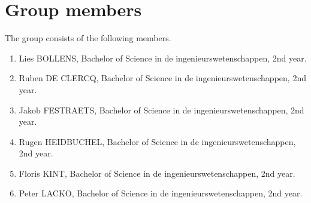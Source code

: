 \section{Group members}
The group consists of the following members.
\begin{enumerate}
 \item Lies BOLLENS, Bachelor of Science in de ingenieurswetenschappen, 2nd year.
 \item Ruben DE CLERCQ, Bachelor of Science in de ingenieurswetenschappen, 2nd year.
 \item Jakob FESTRAETS, Bachelor of Science in de ingenieurswetenschappen, 2nd year.
 \item Rugen HEIDBUCHEL, Bachelor of Science in de ingenieurswetenschappen, 2nd year.
 \item Floris KINT, Bachelor of Science in de ingenieurswetenschappen, 2nd year.
 \item Peter LACKO, Bachelor of Science in de ingenieurswetenschappen, 2nd year.
\end{enumerate}
